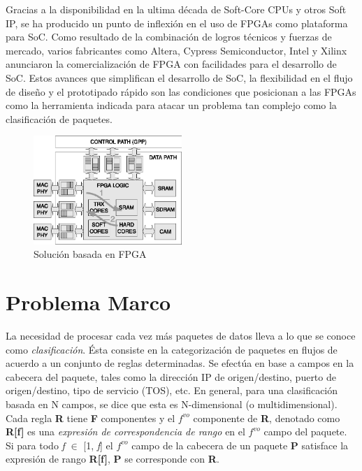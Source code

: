 Gracias a la disponibilidad en la ultima década de Soft-Core CPUs y otros Soft IP, se ha producido un punto de inflexión en el uso de FPGAs como plataforma para SoC. Como resultado de la combinación de logros técnicos y fuerzas de mercado, varios fabricantes como Altera, Cypress Semiconductor, Intel y Xilinx anunciaron la comercialización de FPGA con facilidades para el desarrollo de SoC.
Estos avances que simplifican el desarrollo de SoC, la flexibilidad en el flujo de diseño y el prototipado rápido son las condiciones que posicionan a las FPGAs como la herramienta indicada para atacar un problema tan complejo como la clasificación de paquetes. 

 \begin{figure}[h]
  \centering
	 \includegraphics[width=0.5\textwidth]{1-introduccion/graf/FPGA_based.eps}
  \caption{Solución basada en FPGA}
  \label{fig:diseno}
\end{figure}

     




\section{Problema Marco}

La necesidad de procesar cada vez más paquetes de datos lleva a lo que se conoce como \textit{clasificación}. Ésta consiste en la categorización de paquetes en flujos de acuerdo a un conjunto de reglas determinadas. Se efectúa en base a campos en la cabecera del paquete, tales como la dirección IP de origen/destino, puerto de origen/destino, tipo de servicio (TOS), etc. En general, para una clasificación basada en N campos, se dice que esta es N-dimensional (o multidimensional). Cada regla \textbf{R} tiene \textbf{F} componentes y el $ f^{vo} $ componente de \textbf{R}, denotado como \textbf{R[f]} es una \textit{expresión de correspondencia de rango} en el $ f^{vo} $ campo del paquete. Si para todo \textit{f} $ \in $ [1, \textit{f}] el $ f^{vo} $ campo de la cabecera de un paquete \textbf{P} satisface la expresión de rango \textbf{R[f]}, \textbf{P} se corresponde con \textbf{R}.


